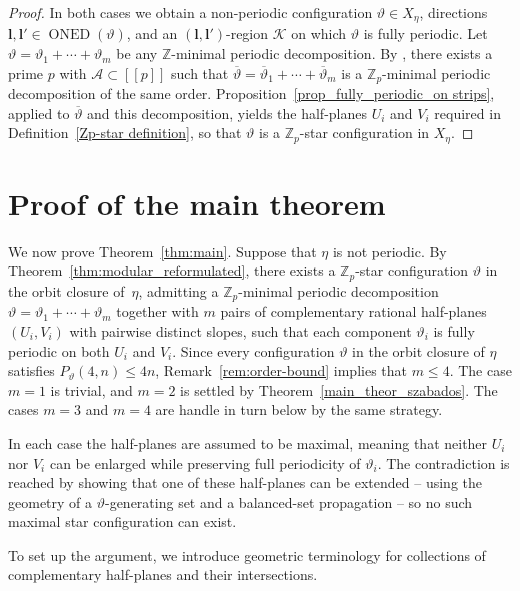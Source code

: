 \documentclass[12pt]{amsart}
\numberwithin{equation}{section}
\DeclareMathOperator{\nexpd}{ONED}
\newcommand{\bb}[1]{\mathbb{#1}}
\newcommand{\llb}{[\![}
\newcommand{\rrb}{]\!]}
\begin{document}
\begin{proof}
In both cases we obtain a non-periodic configuration $\vartheta \in X_\eta$, directions $\pmb{l},\pmb{l}' \in \nexpd(\vartheta)$, and an $(\pmb{l},\pmb{l}')$-region $\mathcal{K}$ on which $ \vartheta $ is fully periodic. Let $\vartheta = \vartheta_1+\cdots+\vartheta_m$ be any $\bb{Z}$-minimal periodic decomposition. By \cite[Theorem 1.5]{Colle22}, there exists a prime $ p $ with $\mathcal{A} \subset \llb p\rrb$ such that $\overline{\vartheta} = \overline{\vartheta}_1+\cdots+\overline{\vartheta}_m$ is a $\bb{Z}_p$-minimal periodic decomposition of the same order. Proposition~\ref{prop_fully_periodic_on strips}, applied to $ \overline{\vartheta} $ and this decomposition, yields the half-planes $ U_i $ and $ V_i $ required in Definition~\ref{Zp-star definition}, so that $\vartheta$ is a $\bb{Z}_p$-star configuration in $ X_\eta $.
\end{proof}

\section{Proof of the main theorem}
\label{sec:main}

We now prove Theorem~\ref{thm:main}. Suppose that $\eta$ is not periodic. By Theorem~\ref{thm:modular_reformulated}, there exists a $\mathbb Z_p$-star configuration $\vartheta$ in the orbit closure of~$\eta$, admitting a $\mathbb Z_p$-minimal periodic decomposition $\vartheta = \vartheta_1 + \cdots + \vartheta_m $ together with $m$ pairs of complementary rational half-planes $(U_i, V_i)$ with pairwise distinct slopes, such that each component $\vartheta_i$ is fully periodic on both $U_i$ and $V_i$. Since every configuration $\vartheta$ in the orbit closure of $ \eta $ satisfies $P_\vartheta(4,n) \le 4n $, Remark~\ref{rem:order-bound} implies that $ m \le 4$. The case $m=1$ is trivial, and $m=2$ is settled by Theorem~\ref{main_theor_szabados}. The cases $ m = 3$ and $ m = 4 $ are handle in turn below by the same strategy.

In each case the half-planes are assumed to be maximal, meaning that neither $ U_i $ nor $ V_i $ can be enlarged while preserving full periodicity of $\vartheta_i$. The contradiction is reached by showing that one of these half-planes can be extended -- using the geometry of a $ \vartheta$-generating set  and a balanced-set propagation -- so no such maximal star configuration can exist.

To set up the argument, we introduce geometric terminology for collections of complementary half-planes and their intersections.
\end{document}
